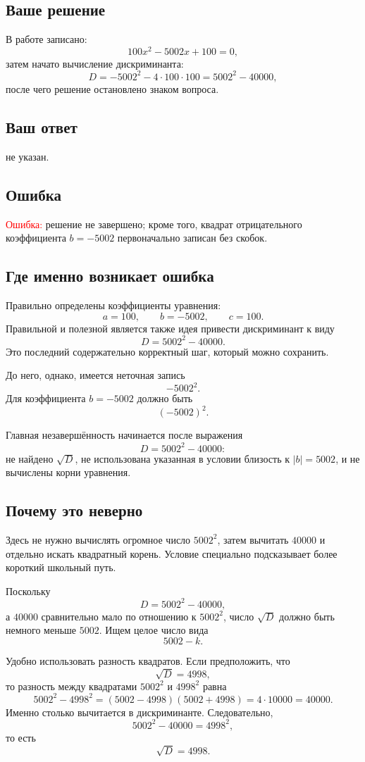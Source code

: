 \documentclass[12pt,a4paper]{article}
\begin{document}
\subsection*{Ваше решение}
В работе записано:
\[
100x^2-5002x+100=0,
\]
затем начато вычисление дискриминанта:
\[
D=-5002^2-4\cdot100\cdot100
=5002^2-40000,
\]
после чего решение остановлено знаком вопроса.

\subsection*{Ваш ответ}
не указан.

\subsection*{Ошибка}
\textcolor{red}{Ошибка:} решение не завершено; кроме того, квадрат отрицательного коэффициента $b=-5002$ первоначально записан без скобок.

\subsection*{Где именно возникает ошибка}
Правильно определены коэффициенты уравнения:
\[
a=100,\qquad b=-5002,\qquad c=100.
\]
Правильной и полезной является также идея привести дискриминант к виду
\[
D=5002^2-40000.
\]
Это последний содержательно корректный шаг, который можно сохранить.

До него, однако, имеется неточная запись
\[
-5002^2.
\]
Для коэффициента $b=-5002$ должно быть
\[
(-5002)^2.
\]

Главная незавершённость начинается после выражения
\[
D=5002^2-40000:
\]
не найдено $\sqrt D$, не использована указанная в условии близость к $|b|=5002$, и не вычислены корни уравнения.

\subsection*{Почему это неверно}
Здесь не нужно вычислять огромное число $5002^2$, затем вычитать $40000$ и отдельно искать квадратный корень. Условие специально подсказывает более короткий школьный путь.

Поскольку
\[
D=5002^2-40000,
\]
а $40000$ сравнительно мало по отношению к $5002^2$, число $\sqrt D$ должно быть немного меньше $5002$. Ищем целое число вида
\[
5002-k.
\]

Удобно использовать разность квадратов. Если предположить, что
\[
\sqrt D=4998,
\]
то разность между квадратами $5002^2$ и $4998^2$ равна
\[
5002^2-4998^2=(5002-4998)(5002+4998)=4\cdot10000=40000.
\]
Именно столько вычитается в дискриминанте. Следовательно,
\[
5002^2-40000=4998^2,
\]
то есть
\[
\sqrt D=4998.
\]
\end{document}
